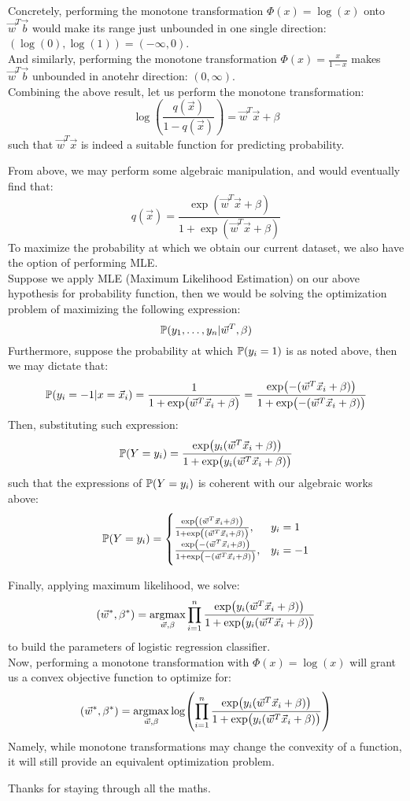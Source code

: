 Concretely, performing the monotone transformation $\Phi(x) = \log (x)$ onto $\vec{w}^T \vec{b}$ would make its range just unbounded in one single direction: $(\log(0), \log(1)) = (-\infty, 0)$. \\
And similarly, performing the monotone transformation $\Phi(x) = \frac{x}{1 - x}$ makes $\vec{w}^T \vec{b}$ unbounded in anotehr direction: $(0, \infty)$. \\
Combining the above result, let us perform the monotone transformation:
\[
    \log (\frac{q(\vec{x})}{1 - q(\vec{x})}) = \vec{w}^T \vec{x} + \beta
\]
such that $\vec{w}^T \vec{x}$ is indeed a suitable function for predicting probability.

From above, we may perform some algebraic manipulation, and would eventually find that:
\[
    q(\vec{x}) = \frac{\exp (\vec{w}^T \vec{x} + \beta)}{1 + \exp (\vec{w}^T \vec{x} + \beta)}
\]
To maximize the probability at which we obtain our current dataset, we also have the option of performing MLE. \\
Suppose we apply MLE (Maximum Likelihood Estimation) on our above hypothesis for probability function, then we would be solving the optimization problem of maximizing the following expression:
\[
    \P(y_1, \dots, y_n | \vec{w}^T, \beta)
\]
Furthermore, suppose the probability at which $\P(y_i = 1)$ is as noted above, then we may dictate that:
\[
    \P(y_i = -1 | x = \vec{x}_i) = \frac{1}{1 + \exp (\vec{w}^T \vec{x}_i + \beta)} = \frac{\exp (- (\vec{w}^T \vec{x}_i + \beta))}{1 + \exp (- (\vec{w}^T \vec{x}_i + \beta))}
\]
Then, substituting such expression:
\begin{align*}
    \P(Y = y_i) = \frac{ \exp (y_i (\vec{w}^T \vec{x}_i + \beta))}{1 + \exp (y_i (\vec{w}^T \vec{x}_i + \beta))}
\end{align*}
such that the expressions of $\P(Y = y_i)$ is coherent with our algebraic works above:
\[
    \P(Y = y_i) =
    \begin{cases}
        \frac{ \exp ( (\vec{w}^T \vec{x}_i + \beta))}{1 + \exp ( (\vec{w}^T \vec{x}_i + \beta))}, &y_i = 1 \\
        \frac{ \exp (- (\vec{w}^T \vec{x}_i + \beta))}{1 + \exp (- (\vec{w}^T \vec{x}_i + \beta))}, &y_i = -1
    \end{cases}
\]

Finally, applying maximum likelihood, we solve:
\[
    (\vec{w}^*, \beta^*) = \underset{\vec{w}, \beta}{\rm argmax} \prod_{i = 1}^n \frac{ \exp (y_i (\vec{w}^T \vec{x}_i + \beta))}{1 + \exp (y_i (\vec{w}^T \vec{x}_i + \beta))}
\]
to build the parameters of logistic regression classifier. \\
Now, performing a monotone transformation with $\Phi(x) = \log(x)$ will grant us a convex objective function to optimize for:
\[
    (\vec{w}^*, \beta^*) = \underset{\vec{w}, \beta}{\rm argmax} \log (\prod_{i = 1}^n \frac{ \exp (y_i (\vec{w}^T \vec{x}_i + \beta))}{1 + \exp (y_i (\vec{w}^T \vec{x}_i + \beta))})
\]
Namely, while monotone transformations may change the convexity of a function, it will still provide an equivalent optimization problem.

Thanks for staying through all the maths.

